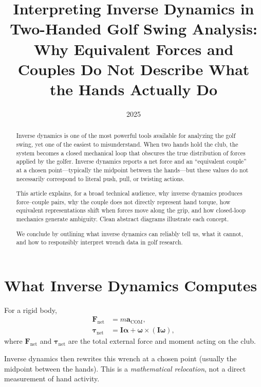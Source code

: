 \documentclass[12pt]{article}
\title{\Large\bfseries
Interpreting Inverse Dynamics in Two-Handed Golf Swing Analysis:\\[4pt]
Why Equivalent Forces and Couples Do Not Describe What the Hands Actually Do}
\author{2025}
\date{}
\begin{document}
\maketitle

\begin{abstract}
Inverse dynamics is one of the most powerful tools available for analyzing the golf swing, yet one of the easiest to misunderstand.  
When two hands hold the club, the system becomes a closed mechanical loop that obscures the true distribution of forces applied by the golfer.  
Inverse dynamics reports a net force and an ``equivalent couple'' at a chosen point—typically the midpoint between the hands—but these values do not necessarily correspond to literal push, pull, or twisting actions.

This article explains, for a broad technical audience, why inverse dynamics produces force--couple pairs, why the couple does not directly represent hand torque, how equivalent representations shift when forces move along the grip, and how closed-loop mechanics generate ambiguity.  
Clean abstract diagrams illustrate each concept.

We conclude by outlining what inverse dynamics can reliably tell us, what it cannot, and how to responsibly interpret wrench data in golf research.
\end{abstract}

\tableofcontents
\newpage

\section{What Inverse Dynamics Computes}

For a rigid body,
\begin{align}
    \mathbf{F}_{\mathrm{net}} &= m \mathbf{a}_{\mathrm{COM}}, \\
    \bm{\tau}_{\mathrm{net}} &= \mathbf{I}\bm{\alpha} + \bm{\omega}\times(\mathbf{I}\bm{\omega}),
\end{align}
where $\mathbf{F}_{\mathrm{net}}$ and $\bm{\tau}_{\mathrm{net}}$ are the total external force and moment acting on the club.

Inverse dynamics then rewrites this wrench at a chosen point (usually the midpoint between the hands).  
This is a \emph{mathematical relocation}, not a direct measurement of hand activity.
\end{document}
